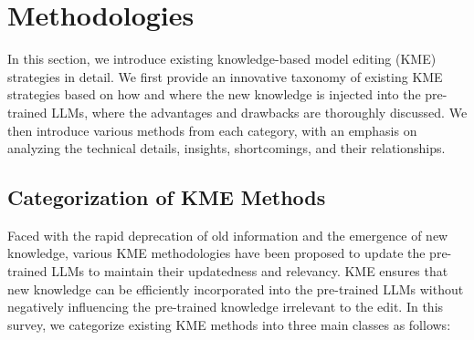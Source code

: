 \documentclass[acmsmall, screen]{acmart}
\begin{document}
\section{Methodologies}\label{sec:method}

In this section, we introduce existing knowledge-based model editing (KME) strategies in detail. We first provide an innovative taxonomy of existing KME strategies based on how and where the new knowledge is injected into the pre-trained LLMs, where the advantages and drawbacks are thoroughly discussed. We then introduce various methods from each category, with an emphasis on analyzing the technical details, insights, shortcomings, and their relationships.

\subsection{Categorization of KME Methods}
\label{sec:category}

Faced with the rapid deprecation of old information and the emergence of new knowledge,  various KME methodologies have been proposed to update the pre-trained LLMs to maintain their updatedness and relevancy. KME ensures that new knowledge can be efficiently incorporated into the pre-trained LLMs without negatively influencing the pre-trained knowledge irrelevant to the edit. In this survey, we categorize existing KME methods into three main classes as follows:
\end{document}
